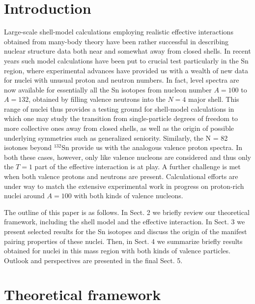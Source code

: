 \documentclass{ws-p8-50x6-00}
\begin{document}
\section{Introduction}
Large-scale shell-model calculations employing realistic effective 
interactions obtained from many-body theory have been rather successful 
in describing nuclear structure data both near and somewhat away from 
closed shells. In recent years such model calculations have been put 
to crucial test particularly in the Sn region, where experimental 
advances have provided us with a wealth of new data for nuclei 
with unusual proton and neutron numbers. In  fact, level spectra 
are now available for essentially all the Sn isotopes from 
nucleon number $A = 100$ to $A = 132$, obtained by filling valence 
neutrons into the $N = 4$ major shell. This range of nuclei thus provides a 
testing ground for shell-model calculations in which one may study 
the transition from single-particle degrees of freedom to 
more collective ones away from closed shells, as well 
as the origin of possible underlying symmetries such as 
generalized seniority. Similarly, the N = 82 isotones beyond $^{132}$Sn 
provide us with the analogous valence proton spectra. 
In both these cases, however, only like valence nucleons are considered 
and thus only the $T = 1$ part of the effective interaction is at play. 
A further challenge is met when both valence protons and neutrons 
are present. Calculational efforts are under way to 
match the extensive experimental work in progress on 
proton-rich nuclei around $A = 100$ with both kinds of valence nucleons.

The outline of this paper is as follows. In Sect. 2 we briefly 
review our theoretical framework, including the shell model 
and the effective interaction. In Sect. 3 we present selected 
results for the Sn isotopes and discuss the origin of the manifest 
pairing properties of these nuclei. Then, in Sect. 4 we summarize 
briefly results obtained for nuclei in this mass region 
with both kinds of valence particles. 
Outlook and perspectives are presented in the final Sect. 5.

\section{Theoretical framework}
\end{document}
